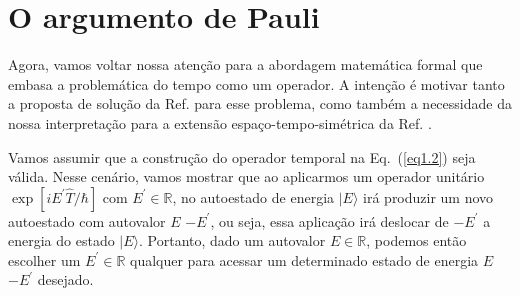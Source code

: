 \section{O argumento de Pauli}
\label{motivacao}

Agora, vamos voltar nossa atenção para a abordagem matemática formal que embasa a problemática do tempo como um operador. A intenção é motivar tanto a proposta de solução da Ref. \cite{Dias} para esse problema, como também a necessidade da nossa interpretação para a extensão espaço-tempo-simétrica da Ref. \cite{Dias}. 

Vamos assumir que a construção do operador temporal na Eq.~(\ref{eq1.2}) seja válida. Nesse cenário, vamos mostrar que ao aplicarmos um operador unitário $\exp \left[i E^{\prime} \hat{T} / \hbar \right]$ com $E^{\prime} \in \mathbb{R}$, no autoestado de energia $| E \rangle$ irá produzir um novo autoestado com autovalor $E$ $-E^{\prime}$, ou seja, essa aplicação irá deslocar de $- E^{\prime}$ a energia do estado $| E \rangle$. Portanto, dado um autovalor $E \in \mathbb{R}$, podemos então escolher um $ E^{\prime} \in \mathbb{R}$ qualquer para acessar um determinado estado de energia $E$ $-E^{\prime}$ desejado.

